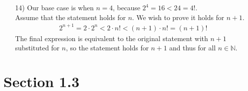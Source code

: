 \documentclass[11pt]{article}
\newcommand{\N}{\mathbb{N}}    %
\begin{document}
\begin{enumerate}
    \item[14)] Our base case is when $n=4$, because $2^4 = 16 < 24 = 4!$. \\
      Assume that the statement holds for $n$. We wish to prove it holds for $n+1$.
      \begin{align}
        2^{n+1} = 2 \cdot2^n < 2 \cdot n! < (n+1) \cdot n! = (n+1)!
      \end{align}
      The final expression is equivalent to the original statement with $n+1$ substituted for $n$, so the statement holds for $n+1$ and thus for all $n \in \N$.
  \end{enumerate}

  \section*{Section 1.3}
\end{document}
